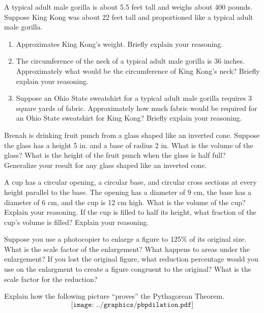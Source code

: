 \begin{prob}
A typical adult male gorilla is about 5.5 feet tall and weighs about 400 pounds. Suppose King Kong was about 22 feet tall and proportioned like a typical adult male gorilla.
\begin{enumerate}
\item Approximates King Kong's weight. Briefly explain your reasoning.
\item The circumference of the neck of a typical adult male gorilla is 36 inches. Approximately what would be the circumference of King Kong's neck? Briefly explain your reasoning.
\item Suppose an Ohio State sweatshirt for a typical adult male gorilla requires 3 square yards of fabric.  Approximately how much fabric would be required for an Ohio State sweatshirt for King Kong?  Briefly explain your reasoning.
\end{enumerate}
\end{prob}

\begin{prob}
Brenah is drinking fruit punch from a glass shaped like an inverted cone.  Suppose the glass has a height 5 in. and a base of radius 2 in.  What is the volume of the glass?  What is the height of the fruit punch when the glass is half full?  Generalize your result for any glass shaped like an inverted cone.  
\end{prob}

\begin{prob}
A cup has a circular opening, a circular base, and circular cross sections at every height parallel to the base.  The opening has a diameter of 9 cm, the base has a diameter of 6 cm, and the cup is 12 cm high.  
What is the volume of the cup?  Explain your reasoning.  
If the cup is filled to half its height, what fraction of the cup's volume is filled?  Explain your reasoning.  
\end{prob}

\begin{prob}
Suppose you use a photocopier to enlarge a figure to 125\% of its original size.  What is the scale factor of the enlargement?  What happens to areas under the enlargement?  If you lost the original figure, what reduction percentage would you use on the enlargment to create a figure congruent to the original?  What is the scale factor for the reduction?  
\end{prob}

\begin{prob}
Explain how the following picture ``proves'' the Pythagorean Theorem.
\[
\texttt{[image: ../graphics/pbpdilation.pdf]}
\]
\end{prob}

